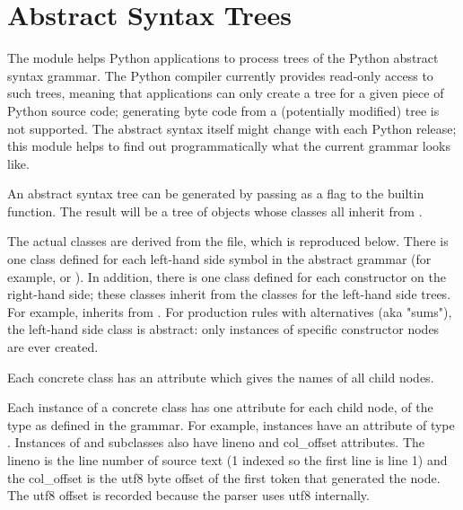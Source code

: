 \chapter{Abstract Syntax Trees\label{ast}}



The  module helps Python applications to process
trees of the Python abstract syntax grammar. The Python compiler
currently provides read-only access to such trees, meaning that
applications can only create a tree for a given piece of Python
source code; generating byte code from a (potentially modified)
tree is not supported. The abstract syntax itself might change with
each Python release; this module helps to find out programmatically
what the current grammar looks like.

An abstract syntax tree can be generated by passing 
as a flag to the  builtin function. The result will be a tree
of objects whose classes all inherit from .

The actual classes are derived from the  file,
which is reproduced below. There is one class defined for each left-hand
side symbol in the abstract grammar (for example,  or ).
In addition, there is one class defined for each constructor on the
right-hand side; these classes inherit from the classes for the left-hand
side trees. For example,  inherits from .
For production rules with alternatives (aka "sums"), the left-hand side
class is abstract: only instances of specific constructor nodes are ever
created.

Each concrete class has an attribute  which gives the
names of all child nodes.

Each instance of a concrete class has one attribute for each child node,
of the type as defined in the grammar. For example, 
instances have an attribute  of type .  
Instances of  and  subclasses also
have lineno and col_offset attributes.  The lineno is the line number
of source text (1 indexed so the first line is line 1) and the
col_offset is the utf8 byte offset of the first token that generated
the node.  The utf8 offset is recorded because the parser uses utf8 
internally.

